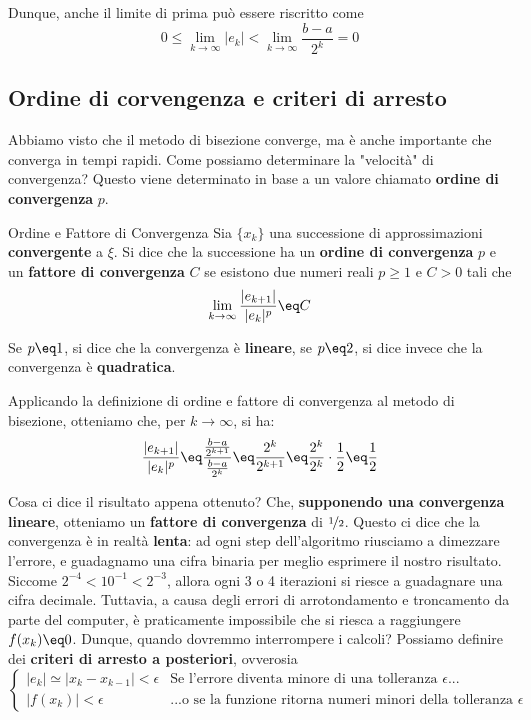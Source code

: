 Dunque, anche il limite di prima può essere riscritto come
\[ 0 \leq \lim_{k \to \infty} |e_k| < \lim_{k \to \infty} \frac{b - a}{2^k} = 0 \]

\subsection{Ordine di corvengenza e criteri di arresto}

Abbiamo visto che il metodo di bisezione converge, ma è anche importante che converga in tempi rapidi. Come possiamo determinare la "velocità" di convergenza? Questo viene determinato in base a un valore chiamato \textbf{ordine di convergenza} $p$.

\begin{definition}{Ordine e Fattore di Convergenza}
    Sia $\{ x_k \}$ una successione di approssimazioni \textbf{convergente} a $\xi$. Si dice che la successione ha un \textbf{ordine di convergenza} $p$ e un \textbf{fattore di convergenza} $C$ se esistono due numeri reali $p \geq 1$ e $C > 0$ tali che
    \[ \lim_{k \to \infty} \frac{|e_{k + 1}|}{|e_k|^p} \eq C \]

    Se $p \eq 1$, si dice che la convergenza è \textbf{lineare}, se $p \eq 2$, si dice invece che la convergenza è \textbf{quadratica}.
\end{definition}

Applicando la definizione di ordine e fattore di convergenza al metodo di bisezione, otteniamo che, per $k \to \infty$, si ha:
\[ \frac{|e_{k + 1}|}{|e_k|^p} \eq \frac{\frac{b - a}{2^{k + 1}}}{\frac{b - a}{2^k}} \eq \frac{2^k}{2^{k + 1}} \eq \frac{2^k}{2^k} \cdot \frac{1}{2} \eq \frac{1}{2} \]

Cosa ci dice il risultato appena ottenuto? Che, \textbf{supponendo una convergenza lineare}, otteniamo un \textbf{fattore di convergenza} di $\nicefrac{1}{2}$. Questo ci dice che la convergenza è in realtà \textbf{lenta}: ad ogni step dell'algoritmo riusciamo a dimezzare l'errore, e guadagnamo una cifra binaria per meglio esprimere il nostro risultato. Siccome $2^{-4} < 10^{-1} < 2^{-3}$, allora ogni 3 o 4 iterazioni si riesce a guadagnare una cifra decimale.
\nwl
Tuttavia, a causa degli errori di arrotondamento e troncamento da parte del computer, è praticamente impossibile che si riesca a raggiungere $f(x_k) \eq 0$. Dunque, quando dovremmo interrompere i calcoli? Possiamo definire dei \textbf{criteri di arresto a posteriori}, ovverosia
\[ \begin{cases}
|e_k| \simeq |x_k - x_{k - 1}| < \epsilon & \text{Se l'errore diventa minore di una tolleranza } \epsilon ... \\
|f(x_k)| < \epsilon & \text{...o se la funzione ritorna numeri minori della tolleranza } \epsilon
\end{cases} \]

